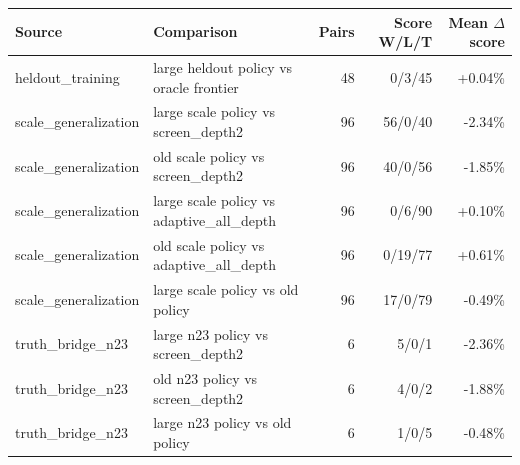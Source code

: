 \begin{tabular}{llrrr}
\toprule
Source & Comparison & Pairs & Score W/L/T & Mean $\Delta$ score \\
\midrule
heldout\_training & large heldout policy vs oracle frontier & 48 & 0/3/45 & +0.04\% \\
scale\_generalization & large scale policy vs screen\_depth2 & 96 & 56/0/40 & -2.34\% \\
scale\_generalization & old scale policy vs screen\_depth2 & 96 & 40/0/56 & -1.85\% \\
scale\_generalization & large scale policy vs adaptive\_all\_depth & 96 & 0/6/90 & +0.10\% \\
scale\_generalization & old scale policy vs adaptive\_all\_depth & 96 & 0/19/77 & +0.61\% \\
scale\_generalization & large scale policy vs old policy & 96 & 17/0/79 & -0.49\% \\
truth\_bridge\_n23 & large n23 policy vs screen\_depth2 & 6 & 5/0/1 & -2.36\% \\
truth\_bridge\_n23 & old n23 policy vs screen\_depth2 & 6 & 4/0/2 & -1.88\% \\
truth\_bridge\_n23 & large n23 policy vs old policy & 6 & 1/0/5 & -0.48\% \\
\bottomrule
\end{tabular}
